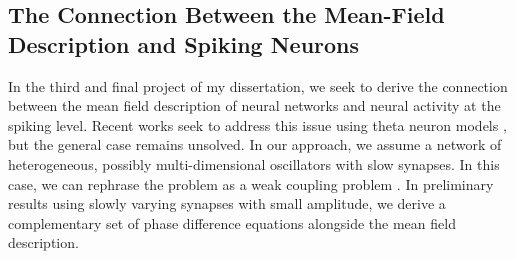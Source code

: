 \documentclass[a4paper,11pt]{article}
\begin{document}
\subsection{The Connection Between the Mean-Field Description and Spiking Neurons}
In the third and final project of my dissertation, we seek to derive the connection between the mean field description of neural networks and neural activity at the spiking level. Recent works seek to address this issue using theta neuron models \cite{laing2014derivation}, but the general case remains unsolved. In our approach, we assume a network of heterogeneous, possibly multi-dimensional oscillators with slow synapses. In this case, we can rephrase the problem as a weak coupling problem \cite{rubinrubin}. In preliminary results using slowly varying synapses with small amplitude, we derive a complementary set of phase difference equations alongside the mean field description.



\end{document}
